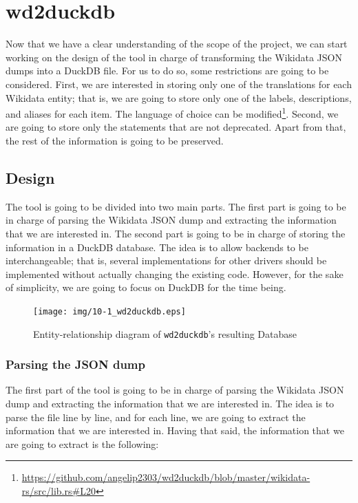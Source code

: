 \section{wd2duckdb}

Now that we have a clear understanding of the scope of the project, we can start working on the design of the tool in charge of transforming the Wikidata JSON dumps into a DuckDB file. For us to do so, some restrictions are going to be considered. First, we are interested in storing only one of the translations for each Wikidata entity; that is, we are going to store only one of the labels, descriptions, and aliases for each item. The language of choice can be modified\footnote{\url{https://github.com/angelip2303/wd2duckdb/blob/master/wikidata-rs/src/lib.rs\#L20}}. Second, we are going to store only the statements that are not deprecated. Apart from that, the rest of the information is going to be preserved.

\label{section:wd2duckdb_design}
\subsection{Design}

The tool is going to be divided into two main parts. The first part is going to be in charge of parsing the Wikidata JSON dump and extracting the information that we are interested in. The second part is going to be in charge of storing the information in a DuckDB database. The idea is to allow backends to be interchangeable; that is, several implementations for other drivers should be implemented without actually changing the existing code. However, for the sake of simplicity, we are going to focus on DuckDB for the time being.

\begin{figure}[ht]
    \centering
    \texttt{[image: img/10-1\_wd2duckdb.eps]}
    \caption{Entity-relationship diagram of \texttt{wd2duckdb}'s resulting Database}
\end{figure}%

\subsubsection{Parsing the JSON dump}

The first part of the tool is going to be in charge of parsing the Wikidata JSON dump and extracting the information that we are interested in. The idea is to parse the file line by line, and for each line, we are going to extract the information that we are interested in. Having that said, the information that we are going to extract is the following:


